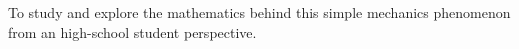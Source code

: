 
{To study and explore the mathematics behind this simple mechanics phenomenon from an high-school student perspective.}
